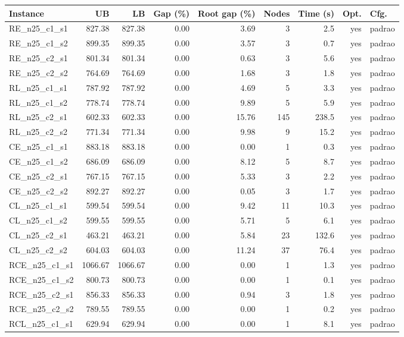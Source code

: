 \begin{tabular}{lrrrrrrrl}
\toprule
Instance & UB & LB & Gap (\%) & Root gap (\%) & Nodes & Time (s) & Opt. & Cfg. \\
\midrule
RE\_n25\_c1\_s1 & 827.38 & 827.38 & 0.00 & 3.69 & 3 & 2.5 & yes & padrao \\
RE\_n25\_c1\_s2 & 899.35 & 899.35 & 0.00 & 3.57 & 3 & 0.7 & yes & padrao \\
RE\_n25\_c2\_s1 & 801.34 & 801.34 & 0.00 & 0.63 & 3 & 5.6 & yes & padrao \\
RE\_n25\_c2\_s2 & 764.69 & 764.69 & 0.00 & 1.68 & 3 & 1.8 & yes & padrao \\
RL\_n25\_c1\_s1 & 787.92 & 787.92 & 0.00 & 4.69 & 5 & 3.3 & yes & padrao \\
RL\_n25\_c1\_s2 & 778.74 & 778.74 & 0.00 & 9.89 & 5 & 5.9 & yes & padrao \\
RL\_n25\_c2\_s1 & 602.33 & 602.33 & 0.00 & 15.76 & 145 & 238.5 & yes & padrao \\
RL\_n25\_c2\_s2 & 771.34 & 771.34 & 0.00 & 9.98 & 9 & 15.2 & yes & padrao \\
CE\_n25\_c1\_s1 & 883.18 & 883.18 & 0.00 & 0.00 & 1 & 0.3 & yes & padrao \\
CE\_n25\_c1\_s2 & 686.09 & 686.09 & 0.00 & 8.12 & 5 & 8.7 & yes & padrao \\
CE\_n25\_c2\_s1 & 767.15 & 767.15 & 0.00 & 5.33 & 3 & 2.2 & yes & padrao \\
CE\_n25\_c2\_s2 & 892.27 & 892.27 & 0.00 & 0.05 & 3 & 1.7 & yes & padrao \\
CL\_n25\_c1\_s1 & 599.54 & 599.54 & 0.00 & 9.42 & 11 & 10.3 & yes & padrao \\
CL\_n25\_c1\_s2 & 599.55 & 599.55 & 0.00 & 5.71 & 5 & 6.1 & yes & padrao \\
CL\_n25\_c2\_s1 & 463.21 & 463.21 & 0.00 & 5.84 & 23 & 132.6 & yes & padrao \\
CL\_n25\_c2\_s2 & 604.03 & 604.03 & 0.00 & 11.24 & 37 & 76.4 & yes & padrao \\
RCE\_n25\_c1\_s1 & 1066.67 & 1066.67 & 0.00 & 0.00 & 1 & 1.3 & yes & padrao \\
RCE\_n25\_c1\_s2 & 800.73 & 800.73 & 0.00 & 0.00 & 1 & 0.1 & yes & padrao \\
RCE\_n25\_c2\_s1 & 856.33 & 856.33 & 0.00 & 0.94 & 3 & 1.8 & yes & padrao \\
RCE\_n25\_c2\_s2 & 789.55 & 789.55 & 0.00 & 0.00 & 1 & 0.2 & yes & padrao \\
RCL\_n25\_c1\_s1 & 629.94 & 629.94 & 0.00 & 0.00 & 1 & 8.1 & yes & padrao \\

\end{tabular}
